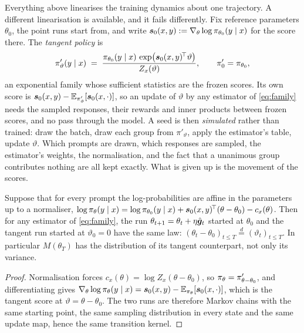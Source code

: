 Everything above linearises the training dynamics about one trajectory. A different linearisation
is available, and it fails differently. Fix reference parameters $\theta_0$, the point runs start
from, and write $\bm{s}_0(x,y) := \nabla_\theta \log \pi_{\theta_0}(y \mid x)$ for the score there.
The \emph{tangent policy} is
\begin{equation}
  \label{eq:tangent}
  \pi'_{\vartheta}(y \mid x)
  \;=\; \frac{\pi_{\theta_0}(y \mid x)\,\exp\!\big(\bm{s}_0(x,y)^{\!\top}\vartheta\big)}
             {Z_x(\vartheta)},
  \qquad \pi'_0 = \pi_{\theta_0},
\end{equation}
an exponential family whose sufficient statistics are the frozen scores. Its own score is
$\bm{s}_0(x,y) - \mathbb{E}_{\pi'_\vartheta}[\bm{s}_0(x,\cdot)]$, so an update of $\vartheta$ by any
estimator of \eqref{eq:family} needs the sampled responses, their rewards and inner products
between frozen scores, and no pass through the model. A seed is then \emph{simulated} rather than
trained: draw the batch, draw each group from $\pi'_\vartheta$, apply the estimator's table, update
$\vartheta$. Which prompts are drawn, which responses are sampled, the estimator's weights, the
normalisation, and the fact that a unanimous group contributes nothing are all kept exactly. What
is given up is the movement of the scores.

\begin{proposition}
  \label{prop:tangent}
  Suppose that for every prompt the log-probabilities are affine in the parameters up to a
  normaliser,
  $\log \pi_{\theta}(y \mid x) = \log \pi_{\theta_0}(y \mid x) + \bm{s}_0(x,y)^{\!\top}(\theta - \theta_0)
  - c_x(\theta)$.
  Then for any estimator of \eqref{eq:family}, the run $\theta_{t+1} = \theta_t + \eta\hat{\bm{g}}_t$
  started at $\theta_0$ and the tangent run started at $\vartheta_0 = 0$ have the same law:
  $(\theta_t - \theta_0)_{t \le T} \overset{d}{=} (\vartheta_t)_{t \le T}$. In particular
  $M(\theta_T)$ has the distribution of its tangent counterpart, not only its variance.
\end{proposition}

\begin{proof}
  Normalisation forces $c_x(\theta) = \log Z_x(\theta - \theta_0)$, so
  $\pi_{\theta} = \pi'_{\theta - \theta_0}$, and differentiating gives
  $\nabla_\theta \log \pi_{\theta}(y \mid x) = \bm{s}_0(x,y) - \mathbb{E}_{\pi_{\theta}}[\bm{s}_0(x,\cdot)]$, which is
  the tangent score at $\vartheta = \theta - \theta_0$. The two runs are therefore Markov chains
  with the same starting point, the same sampling distribution in every state and the same update
  map, hence the same transition kernel.
\end{proof}

